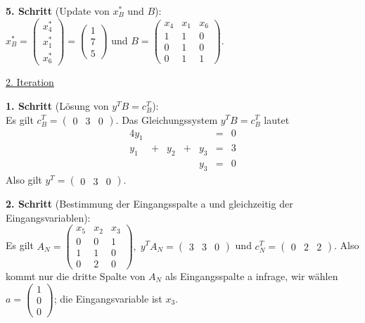 \documentclass[10pt,a4paper,oneside,ngerman,numbers=noenddot]{scrartcl}
\begin{document}
		\textbf{5. Schritt} (Update von $x_{B}^{*}$ und $B$):\\
		$x_{B}^{*} = \begin{pmatrix} x_{4}^{*} \\ x_{1}^{*} \\ x_{6}^{*} \end{pmatrix} = \begin{pmatrix} 1 \\ 7 \\ 5 \end{pmatrix}$ und $B = \begin{pmatrix} x_{4} & x_{1} & x_{6} \\ 1 & 1 & 0 \\ 0 & 1 & 0 \\ 0 & 1 & 1 \end{pmatrix}$.
		
		\underline{2. Iteration}
		
		\textbf{1. Schritt} (Lösung von $y^{T}B = c_{B}^{T}$):\\
		Es gilt $c_{B}^{T} = \begin{pmatrix} 0 & 3 & 0 \end{pmatrix}$. Das Gleichungssystem $y^{T}B = c_{B}^{T}$ lautet
		\begin{alignat*}{4}
			y_{1} && && &=& 0 \\
			y_{1} &+& y_{2} &+& y_{3} &=& 3 \\
			&& && y_{3} &=& 0
		\end{alignat*}
		Also gilt $y^{T} = \begin{pmatrix} 0 & 3 & 0 \end{pmatrix}$.
		
		\textbf{2. Schritt} (Bestimmung der Eingangsspalte a und gleichzeitig der Eingangsvariablen):\\
		Es gilt $A_{N} = \begin{pmatrix} x_{5} & x_{2} & x_{3} \\ 0 & 0 & 1 \\ 1 & 1 & 0 \\ 0 & 2 & 0 \end{pmatrix},\; y^{T}A_{N} = \begin{pmatrix} 3 & 3 & 0 \end{pmatrix}$ und $c_{N}^{T} = \begin{pmatrix} 0 & 2 & 2 \end{pmatrix}$. Also kommt nur die dritte Spalte von $A_{N}$ als Eingangsspalte a infrage, wir wählen $a = \begin{pmatrix} 1 \\ 0 \\ 0 \end{pmatrix}$; die Eingangsvariable ist $x_{3}$.
		
\end{document}
